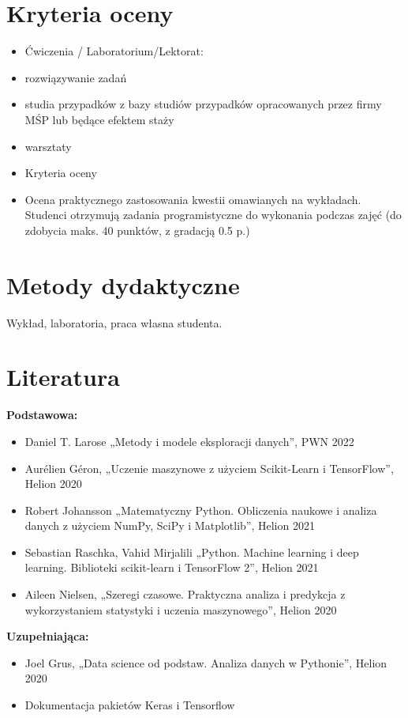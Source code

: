 \documentclass[12pt, a4paper]{article}
\begin{document}
\section{Kryteria oceny}

\begin{itemize}
  \item Ćwiczenia / Laboratorium/Lektorat:
  \item rozwiązywanie zadań
  \item studia przypadków z bazy studiów przypadków opracowanych przez firmy MŚP lub będące efektem staży
  \item warsztaty
  \item Kryteria oceny
  \item Ocena praktycznego zastosowania kwestii omawianych na wykładach. Studenci otrzymują zadania programistyczne do wykonania podczas zajęć (do zdobycia maks. 40 punktów, z gradacją 0.5 p.)
\end{itemize}

\section{Metody dydaktyczne}

Wykład, laboratoria, praca własna studenta.

\section{Literatura}

\textbf{Podstawowa:}
\begin{itemize}
  \item Daniel T. Larose „Metody i modele eksploracji danych”, PWN 2022
  \item Aurélien Géron, „Uczenie maszynowe z użyciem Scikit-Learn i TensorFlow”, Helion 2020
  \item Robert Johansson „Matematyczny Python. Obliczenia naukowe i analiza danych z użyciem NumPy, SciPy i Matplotlib”, Helion 2021
  \item Sebastian Raschka, Vahid Mirjalili „Python. Machine learning i deep learning. Biblioteki scikit-learn i TensorFlow 2”, Helion 2021
  \item Aileen Nielsen, „Szeregi czasowe. Praktyczna analiza i predykcja z wykorzystaniem statystyki i uczenia maszynowego”, Helion 2020
\end{itemize}

\textbf{Uzupełniająca:}
\begin{itemize}
  \item Joel Grus, „Data science od podstaw. Analiza danych w Pythonie”, Helion 2020
  \item Dokumentacja pakietów Keras i Tensorflow
\end{itemize}
\end{document}
